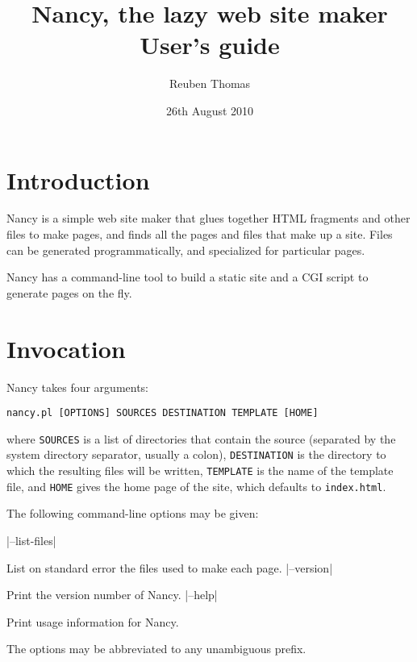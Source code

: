 \documentclass[english]{scrartcl}
\begin{document}
\title{Nancy, the lazy web site maker\\User’s guide}
\date{26th August 2010}
\author{Reuben Thomas}
\maketitle

\section{Introduction}

Nancy is a simple web site maker that glues together HTML fragments and other files to make pages, and finds all the pages and files that make up a site. Files can be generated programmatically, and specialized for particular pages.

Nancy has a command-line tool to build a static site and a CGI script to generate pages on the fly.

\section{Invocation}

Nancy takes four arguments:

\begin{verbatim}
nancy.pl [OPTIONS] SOURCES DESTINATION TEMPLATE [HOME]
\end{verbatim}

\noindent where \verb|SOURCES| is a list of directories that contain the source (separated by the system directory separator, usually a colon), \verb|DESTINATION| is the directory to which the resulting files will be written, \verb|TEMPLATE| is the name of the template file, and \verb|HOME| gives the home page of the site, which defaults to \verb|index.html|.

The following command-line options may be given:

\begin{description}
|--list-files|
\item[\UseVerb{listfiles}]List on standard error the files used to make each page.
|--version|
\item[\UseVerb{version}]Print the version number of Nancy.
|--help|
\item[\UseVerb{help}]Print usage information for Nancy.
\end{description}

The options may be abbreviated to any unambiguous prefix.
\end{document}
